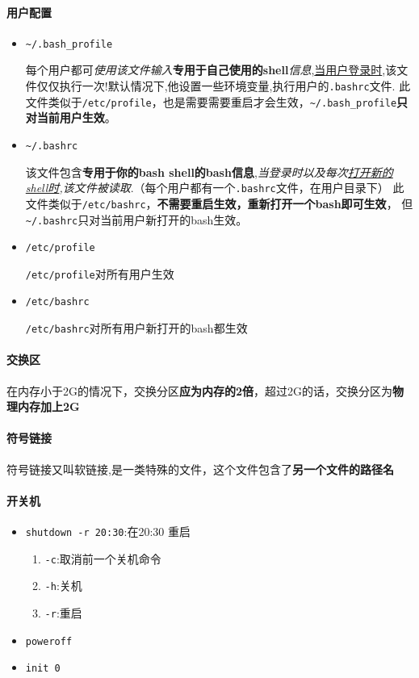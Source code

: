 \documentclass[UTF8,a4paper,12pt]{ctexbook}
\begin{document}
			\paragraph{用户配置}
				\begin{itemize}
					\item  \verb|~/.bash_profile|
					
						每个用户都可\textit{使用该文件输入}\textbf{专用于自己使用的shell}\textit{信息},\underline{当用户登录时},该文件仅仅执行一次!默认情况下,他设置一些环境变量,执行用户的\verb|.bashrc|文件. 此文件类似于\verb|/etc/profile|，也是需要需要重启才会生效，\verb|~/.bash_profile|\textbf{只对当前用户生效}。
					\item  \verb|~/.bashrc|
						
						该文件包含\textbf{专用于你的bash shell的bash信息},\textit{当登录时以及每次\underline{打开新的shell时},该文件被读取}.（每个用户都有一个\verb|.bashrc|文件，在用户目录下） 此文件类似于\verb|/etc/bashrc|，\textbf{不需要重启生效，重新打开一个bash即可生效}， 但\verb|~/.bashrc|只对当前用户新打开的bash生效。
						
					\item  \verb|/etc/profile|
					
						\verb|/etc/profile|对所有用户生效
					
					\item  \verb|/etc/bashrc|
					
						\verb|/etc/bashrc|对所有用户新打开的bash都生效
				\end{itemize}
			
			\paragraph{交换区} 在内存小于2G的情况下，交换分区\textbf{应为内存的2倍}，超过2G的话，交换分区为\textbf{物理内存加上2G}	
			
			\paragraph{符号链接}符号链接又叫软链接,是一类特殊的文件，这个文件包含了\textbf{另一个文件的路径名}
			
			\paragraph{开关机}
				\begin{itemize}[itemindent = 1em]
					\item \verb|shutdown -r 20:30|:在20:30 重启
						\begin{enumerate}
							\item \verb|-c|:取消前一个关机命令
							\item \verb|-h|:关机
							\item \verb|-r|:重启
						\end{enumerate}
					\item \verb|poweroff|
					\item \verb|init 0|
				\end{itemize}
			
\end{document}
